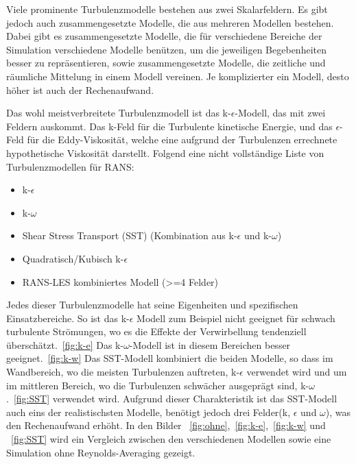 \begin{refsection}
Viele prominente Turbulenzmodelle bestehen aus zwei Skalarfeldern.
Es gibt jedoch auch zusammengesetzte Modelle, die aus mehreren Modellen bestehen.
Dabei gibt es zusammengesetzte Modelle, die für verschiedene Bereiche der Simulation verschiedene Modelle benützen,
um die jeweiligen Begebenheiten besser zu repräsentieren,
sowie zusammengesetzte Modelle, die zeitliche und räumliche Mittelung in einem Modell vereinen.
Je komplizierter ein Modell, desto höher ist auch der Rechenaufwand.

Das wohl meistverbreitete Turbulenzmodell ist das k-$\epsilon$-Modell, das mit zwei Feldern auskommt. Das k-Feld für die
Turbulente kinetische Energie, und das $\epsilon$-Feld für die Eddy-Viskosität, welche eine aufgrund der Turbulenzen errechnete
hypothetische Viskosität darstellt.
Folgend eine nicht vollständige Liste von Turbulenzmodellen für RANS:

\begin{itemize}
    \item k-$\epsilon$
    \item k-$\omega$
    \item Shear Stress Transport (SST) (Kombination aus k-$\epsilon$ und k-$\omega$)
    \item Quadratisch/Kubisch k-$\epsilon$
    \item RANS-LES kombiniertes Modell (>=4 Felder)
\end{itemize}

Jedes dieser Turbulenzmodelle hat seine Eigenheiten und spezifischen Einsatzbereiche.
So ist das k-$\epsilon$ Modell zum Beispiel nicht geeignet für schwach turbulente Strömungen,
wo es die Effekte der Verwirbellung tendenziell überschätzt.~\ref{fig:k-e}
Das k-$\omega$-Modell ist in diesem Bereichen besser geeignet.~\ref{fig:k-w}
Das SST-Modell kombiniert die beiden Modelle, so dass im Wandbereich,
wo die meisten Turbulenzen auftreten, k-$\epsilon$ verwendet wird und um im mittleren Bereich,
wo die Turbulenzen schwächer ausgeprägt sind, k-$\omega$.~\ref{fig:SST} verwendet wird.
Aufgrund dieser Charakteristik ist das SST-Modell auch eins der realistischsten Modelle,
benötigt jedoch drei Felder(k, $\epsilon$ und $\omega$), was den Rechenaufwand erhöht.
In den Bilder ~\ref{fig:ohne},~\ref{fig:k-e},~\ref{fig:k-w} und ~\ref{fig:SST}
wird ein Vergleich zwischen den verschiedenen Modellen sowie eine Simulation ohne
Reynolds-Averaging gezeigt.


\end{refsection}
